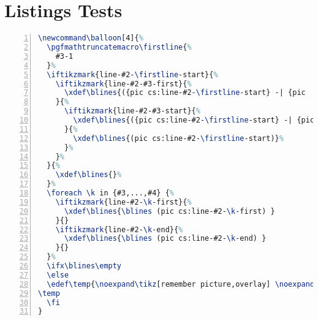 \documentclass[a4paper]{article}
\begin{document}
\newpage

\section{Listings Tests}


\newcommand\balloon[4]{%
  \pgfmathtruncatemacro\firstline{%
    #3-1
  }%
  \iftikzmark{line-#2-\firstline-start}{%
    \iftikzmark{line-#2-#3-first}{%
      \xdef\blines{({pic cs:line-#2-\firstline-start} -| {pic           cs:line-#2-#3-first})}%
    }{%
      \iftikzmark{line-#2-#3-start}{%
        \xdef\blines{({pic cs:line-#2-\firstline-start} -| {pic             cs:line-#2-#3-start})}%
      }{%
        \xdef\blines{(pic cs:line-#2-\firstline-start)}%
      }%
    }%
  }{%
    \xdef\blines{}%
  }%
  \foreach \k in {#3,...,#4} {%
    \iftikzmark{line-#2-\k-first}{%
      \xdef\blines{\blines (pic cs:line-#2-\k-first) }
    }{}
    \iftikzmark{line-#2-\k-end}{%
      \xdef\blines{\blines (pic cs:line-#2-\k-end) }
    }{}
  }%
  \ifx\blines\empty
  \else
  \edef\temp{\noexpand\tikz[remember picture,overlay]\noexpand\node[fit={\blines},balloon] (#1) {};}%
\temp
  \fi
}


\begin{lstlisting}[language=TeX,name=texcode,numbers=left,breakatwhitespace=true,breaklines=true]
\newcommand\balloon[4]{%
  \pgfmathtruncatemacro\firstline{%
    #3-1
  }%
  \iftikzmark{line-#2-\firstline-start}{%
    \iftikzmark{line-#2-#3-first}{%
      \xdef\blines{({pic cs:line-#2-\firstline-start} -| {pic           cs:line-#2-#3-first})}%
    }{%
      \iftikzmark{line-#2-#3-start}{%
        \xdef\blines{({pic cs:line-#2-\firstline-start} -| {pic             cs:line-#2-#3-start})}%
      }{%
        \xdef\blines{(pic cs:line-#2-\firstline-start)}%
      }%
    }%
  }{%
    \xdef\blines{}%
  }%
  \foreach \k in {#3,...,#4} {%
    \iftikzmark{line-#2-\k-first}{%
      \xdef\blines{\blines (pic cs:line-#2-\k-first) }
    }{}
    \iftikzmark{line-#2-\k-end}{%
      \xdef\blines{\blines (pic cs:line-#2-\k-end) }
    }{}
  }%
  \ifx\blines\empty
  \else
  \edef\temp{\noexpand\tikz[remember picture,overlay] \noexpand\node[fit={\blines},balloon] (#1) {};}%
\temp
  \fi
}
\end{lstlisting}
\end{document}
